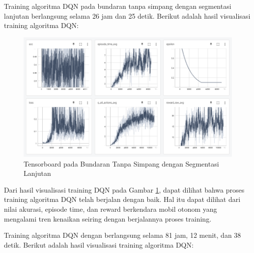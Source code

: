 \documentclass[conference]{IEEEtran}
\begin{document}
	Training algoritma DQN pada bundaran tanpa simpang dengan segmentasi lanjutan berlangsung selama 26 jam dan 25 detik. Berikut adalah hasil visualisasi training algoritma DQN:
	
	\begin{figure}[H] 
		\centering
		\includegraphics[width=1\linewidth]{images/tensorboard_itemputih_nosimpang}
		\caption{Tensorboard pada Bundaran Tanpa Simpang dengan Segmentasi Lanjutan}
		\label{fig:tensorboard_bundaran_tanpasimpang_segmentasi_lanjutan}
	\end{figure}
	
	Dari hasil visualisasi training DQN pada Gambar \ref{fig:tensorboard_bundaran_tanpasimpang_segmentasi_lanjutan}, dapat dilihat bahwa proses training algoritma DQN telah berjalan dengan baik. Hal itu dapat dilihat dari nilai akurasi, episode time, dan reward berkendara mobil otonom yang mengalami tren kenaikan seiring dengan berjalannya proses training.
	
	
	\iffalse
	Training algoritma DQN dengan
	berlangsung selama 81 jam, 12 menit, dan 38 detik. Berikut adalah hasil visualisasi training algoritma DQN:
	
\end{document}
